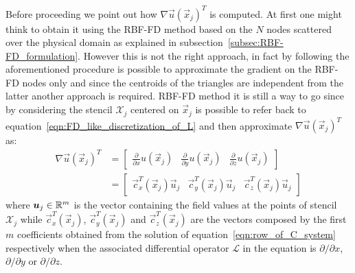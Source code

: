 \smallskip
Before proceeding we point out how $\nabla \vec{u}(\vec{x}_j)^T$ is computed. At first one might think to obtain it using the RBF-FD method based on the $N$ nodes scattered over the physical domain as explained in subsection~\vref{subsec:RBF-FD_formulation}. However this is not the right approach, in fact by following the aforementioned procedure is possible to approximate the gradient on the RBF-FD nodes only and since the centroids of the triangles are independent from the latter another approach is required. RBF-FD method it is still a way to go since by considering the stencil $\mathcal{X}_j$ centered on $\vec{x}_j$ is possible to refer back to equation~\eqref{eqn:FD_like_discretization_of_L} and then approximate $\nabla \vec{u}(\vec{x}_j)^T$ as:
\begin{equation}
	\begin{split}
		\nabla \vec{u}(\vec{x}_j)^T & =
		\begin{bmatrix}
			\frac{\partial}{\partial x} u(\vec{x}_j)  &  \frac{\partial}{\partial y} u(\vec{x}_j)  &  \frac{\partial}{\partial z} u(\vec{x}_j)
		\end{bmatrix} \\
		& =
		\begin{bmatrix}
			\vec{c}_x^T(\vec{x}_j) \vec{u}_j  &  \vec{c}_y^T(\vec{x}_j) \vec{u}_j  &  \vec{c}_z^T(\vec{x}_j) \vec{u}_j
		\end{bmatrix}
	\end{split}
\end{equation}
where $\boldsymbol{u}_j \in \mathbb{R}^m$ is the vector containing the field values at the points of stencil $ \mathcal{X}_j$ while $\vec{c}_x^T(\vec{x}_j)$, $\vec{c}_y^T(\vec{x}_j)$ and $\vec{c}_z^T(\vec{x}_j)$ are the vectors composed by the first $m$ coefficients obtained from the solution of equation~\eqref{eqn:row_of_C_system} respectively when the associated differential operator $\mathcal{L}$ in the equation is $\partial / \partial x$, $\partial / \partial y$ or $\partial / \partial z$.

